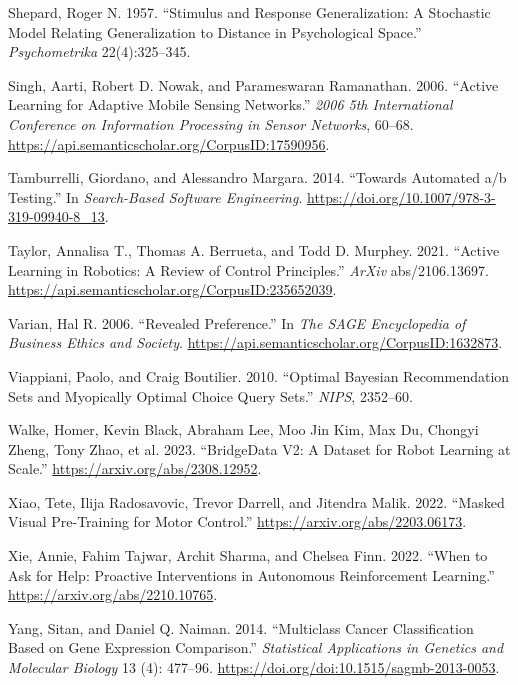 \documentclass[
  letterpaper,
  numbers=noenddot,
  DIV=11]{scrreprt}
\newlength{\cslhangindent}
\newenvironment{CSLReferences}[2] %
 {\begin{list}{}{%
  \setlength{\itemindent}{0pt}
  \setlength{\leftmargin}{0pt}
  \setlength{\parsep}{0pt}
  \ifodd #1
   \setlength{\leftmargin}{\cslhangindent}
   \setlength{\itemindent}{-1\cslhangindent}
  \fi
  \setlength{\itemsep}{#2\baselineskip}}}
 {\end{list}}
\theoremstyle{plain}
\theoremstyle{definition}
\theoremstyle{plain}
\theoremstyle{remark}
\begin{document}
\begin{CSLReferences}{1}{0}
Shepard, Roger N. 1957. {``Stimulus and Response Generalization: A
Stochastic Model Relating Generalization to Distance in Psychological
Space.''} \emph{Psychometrika} 22(4):325--345.

Singh, Aarti, Robert D. Nowak, and Parameswaran Ramanathan. 2006.
{``Active Learning for Adaptive Mobile Sensing Networks.''} \emph{2006
5th International Conference on Information Processing in Sensor
Networks}, 60--68.
\url{https://api.semanticscholar.org/CorpusID:17590956}.

Tamburrelli, Giordano, and Alessandro Margara. 2014. {``Towards
Automated a/b Testing.''} In \emph{Search-Based Software Engineering}.
\url{https://doi.org/10.1007/978-3-319-09940-8_13}.

Taylor, Annalisa T., Thomas A. Berrueta, and Todd D. Murphey. 2021.
{``Active Learning in Robotics: A Review of Control Principles.''}
\emph{ArXiv} abs/2106.13697.
\url{https://api.semanticscholar.org/CorpusID:235652039}.

Varian, Hal R. 2006. {``Revealed Preference.''} In \emph{The SAGE
Encyclopedia of Business Ethics and Society}.
\url{https://api.semanticscholar.org/CorpusID:1632873}.

Viappiani, Paolo, and Craig Boutilier. 2010. {``Optimal Bayesian
Recommendation Sets and Myopically Optimal Choice Query Sets.''}
\emph{NIPS}, 2352--60.

Walke, Homer, Kevin Black, Abraham Lee, Moo Jin Kim, Max Du, Chongyi
Zheng, Tony Zhao, et al. 2023. {``BridgeData V2: A Dataset for Robot
Learning at Scale.''} \url{https://arxiv.org/abs/2308.12952}.

Xiao, Tete, Ilija Radosavovic, Trevor Darrell, and Jitendra Malik. 2022.
{``Masked Visual Pre-Training for Motor Control.''}
\url{https://arxiv.org/abs/2203.06173}.

Xie, Annie, Fahim Tajwar, Archit Sharma, and Chelsea Finn. 2022. {``When
to Ask for Help: Proactive Interventions in Autonomous Reinforcement
Learning.''} \url{https://arxiv.org/abs/2210.10765}.

Yang, Sitan, and Daniel Q. Naiman. 2014. {``Multiclass Cancer
Classification Based on Gene Expression Comparison.''} \emph{Statistical
Applications in Genetics and Molecular Biology} 13 (4): 477--96.
\url{https://doi.org/doi:10.1515/sagmb-2013-0053}.


\end{CSLReferences}
\end{document}
